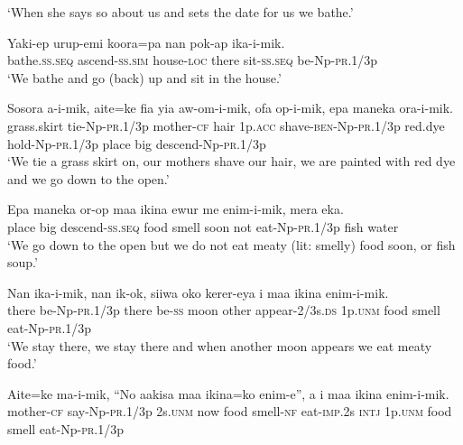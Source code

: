 \glt ‘When she says so about us and sets the date for us we bathe.’ \\
\z


\ea
\gll  Yaki-ep  urup-emi  koora=pa  nan  pok-ap  ika-i-mik. \\
bathe.\textsc{ss.seq}  ascend-\textsc{ss}.\textsc{sim}  house-\textsc{loc}  there  sit-\textsc{ss.seq}  be-Np-\textsc{pr}.1/3p \\
\glt ‘We bathe and go (back) up and sit in the house.’ \\
\z


\ea
\gll  Sosora  a-i-mik,  aite=ke  fia  yia  aw-om-i-mik,                      ofa  op-i-mik,  epa  maneka  ora-i-mik. \\
grass.skirt  tie-Np-\textsc{pr}.1/3p  mother-\textsc{cf}  hair  1p.\textsc{acc}  shave-\textsc{ben}-Np-\textsc{pr}.1/3p   red.dye  hold-Np-\textsc{pr}.1/3p  place  big  descend-Np-\textsc{pr}.1/3p \\


\glt ‘We tie a grass skirt on, our mothers shave our hair, we are painted with red dye and we go down to the open.’ \\
\z


\ea
\gll  Epa  maneka  or-op  maa  ikina  ewur  me  enim-i-mik,         mera  eka. \\
place  big  descend-\textsc{ss.seq}  food  smell  soon  not  eat-Np-\textsc{pr}.1/3p  fish  water \\


\glt ‘We go down to the open but we do not eat meaty (lit: smelly) food soon, or fish soup.’ \\
\z


\ea
\gll  Nan  ika-i-mik,  nan  ik-ok,  siiwa  oko  kerer-eya  i             maa  ikina  enim-i-mik. \\
there  be-Np-\textsc{pr}.1/3p  there  be-\textsc{ss}  moon  other  appear-2/3s.\textsc{ds}  1p.\textsc{unm}  food  smell  eat-Np-\textsc{pr}.1/3p \\


\glt ‘We stay there, we stay there and when another moon appears we eat meaty food.’ \\
\z


\ea
\gll  Aite=ke  ma-i-mik,  “No  aakisa  maa  ikina=ko  enim-e”,  a        i  maa  ikina  enim-i-mik. \\
mother-\textsc{cf}  say-Np-\textsc{pr}.1/3p  2s.\textsc{unm}  now  food  smell-\textsc{nf}  eat-\textsc{imp}.2s  \textsc{intj} 1p.\textsc{unm}  food  smell  eat-Np-\textsc{pr}.1/3p \\


